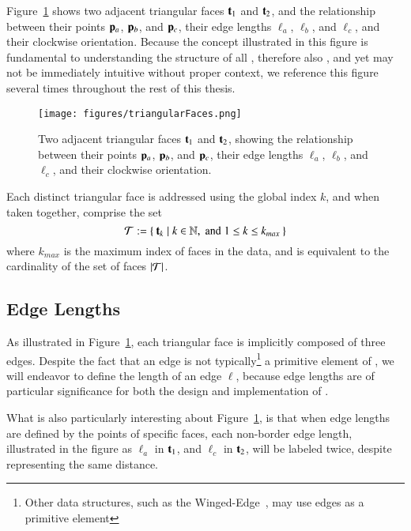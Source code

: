 Figure~\ref{fig:triangularFaces} shows two adjacent triangular faces $\mathbf{t}_1$ and $\mathbf{t}_2$, and the relationship between their points $\mathbf{p}_a$, $\mathbf{p}_b$, and $\mathbf{p}_c$, their edge lengths $\ell_a$, $\ell_b$, and $\ell_c$, and their clockwise orientation. Because the concept illustrated in this figure is fundamental to understanding the structure of all \tdd{}, therefore also , and yet may not be immediately intuitive without proper context, we reference this figure several times throughout the rest of this thesis.

\begin{figure}[ht]
\ffigbox
	{\texttt{[image: figures/triangularFaces.png]}}
	{\caption[Two Triangular Faces]{Two adjacent triangular faces $\mathbf{t}_1$ and $\mathbf{t}_2$, showing the relationship between their points $\mathbf{p}_a$, $\mathbf{p}_b$, and $\mathbf{p}_c$, their edge lengths $\ell_a$, $\ell_b$, and $\ell_c$, and their clockwise orientation.}\label{fig:triangularFaces}}
\end{figure}

Each distinct triangular face is addressed using the global index $k$, and when taken together, comprise the set
%
\begin{equation}
	\mathcal{T} := \left \{\:\mathbf{t}_k \mid k \in \mathbb{N}, \;\text{and}\; 1\leq k \leq k_{max}\:\right \}
	\label{eq:defineSetOfFaces}
\end{equation}
%
where $k_{max}$ is the maximum index of faces in the data, and is equivalent to the cardinality of the set of faces $|\mathcal{T}|$.%
%
%

%
%
%
%
\subsection{Edge Lengths}
\label{ch2s3ssEL}
As illustrated in Figure~\ref{fig:triangularFaces}, each triangular face is implicitly composed of three edges. Despite the fact that an edge is not typically\footnote{Other data structures, such as the Winged-Edge~\cite[p.~1]{Baumgart75}, may use edges as a primitive element} a primitive element of \tdd{}, we will endeavor to define the length of an edge $\ell$, because edge lengths are of particular significance for both the design and implementation of .

What is also particularly interesting about Figure~\ref{fig:triangularFaces}, is that when edge lengths are defined by the points of specific faces, each non-border edge length, illustrated in the figure as $\ell_a$ in $\mathbf{t}_1$, and $\ell_c$ in $\mathbf{t}_2$, will be labeled twice, despite representing the same distance.

